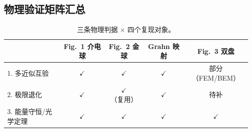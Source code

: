 \subsection{物理验证矩阵汇总}

\begin{table}[H]
\centering
\small
\begin{tabular}{lcccc}
\toprule
& Fig.~1 介电球 & Fig.~2 金球 & Grahn 映射 & Fig.~3 双盘 \\
\midrule
1. 多近似互验 & $\checkmark$ & $\checkmark$ & $\checkmark$ & 部分（FEM/BEM） \\
2. 极限退化 & $\checkmark$ & $\checkmark$（复用） & $\checkmark$ & 待补 \\
3. 能量守恒/光学定理 & $\checkmark$ & $\checkmark$ & $\checkmark$ & $\checkmark$ \\
\bottomrule
\end{tabular}
\caption{三条物理判据 × 四个复现对象。}
\label{tab:verification_matrix}
\end{table}

